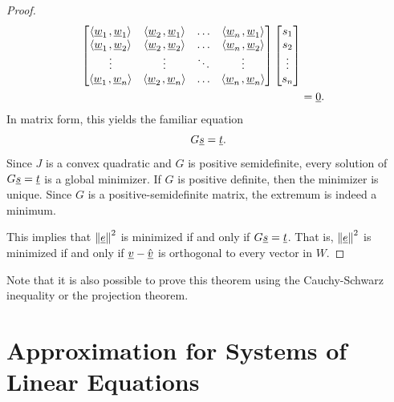 \begin{proof}
\begin{equation*}
\begin{split}
\begin{bmatrix}
{\left\langle  \underline{w}_1  \mskip2mu ,  \underline{w}_1  \right\rangle} &
{\left\langle  \underline{w}_2  \mskip2mu ,  \underline{w}_1  \right\rangle} & \hdots &
{\left\langle  \underline{w}_n  \mskip2mu ,  \underline{w}_1  \right\rangle} \\
{\left\langle  \underline{w}_1  \mskip2mu ,  \underline{w}_2  \right\rangle} &
{\left\langle  \underline{w}_2  \mskip2mu ,  \underline{w}_2  \right\rangle} & \hdots &
{\left\langle  \underline{w}_n  \mskip2mu ,  \underline{w}_2  \right\rangle} \\
\vdots & \vdots & \ddots & \vdots \\
{\left\langle  \underline{w}_1  \mskip2mu ,  \underline{w}_n  \right\rangle} &
{\left\langle  \underline{w}_2  \mskip2mu ,  \underline{w}_n  \right\rangle} & \hdots &
{\left\langle  \underline{w}_n  \mskip2mu ,  \underline{w}_n  \right\rangle} \\
\end{bmatrix}
\begin{bmatrix} s_1 \\ s_2 \\ \vdots \\ s_n \end{bmatrix} \\
&= \underline{0} .
\end{split}
\end{equation*}
In matrix form, this yields the familiar equation
\begin{equation*}
G \underline{s} = \underline{t}.
\end{equation*}
Since $J$ is a convex quadratic and $G$ is positive semidefinite, every solution of $G\underline s=\underline t$ is a global minimizer.
If $G$ is positive definite, then the minimizer is unique.
Since $G$ is a positive-semidefinite matrix, the extremum is indeed a minimum.

This implies that $\left\| \underline{e} \right\|^2$ is minimized if and only if $G \underline{s} = \underline{t}$.
That is, $\left\| \underline{e} \right\|^2$ is minimized if and only if $\underline{v} - \hat{\underline{v}}$ is orthogonal to every vector in $W$.
\end{proof}

Note that it is also possible to prove this theorem using the Cauchy-Schwarz inequality or the projection theorem.


\section{Approximation for Systems of Linear Equations}

